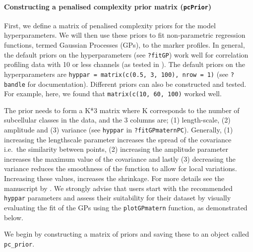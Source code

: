 \documentclass[9pt,a4paper,]{extarticle}
\begin{document}
\paragraph{\texorpdfstring{Constructing a penalised complexity prior matrix (\texttt{pcPrior})}{Constructing a penalised complexity prior matrix (pcPrior)}}\label{constructing-a-penalised-complexity-prior-matrix-pcprior}

First, we define a matrix of penalised complexity priors for the model
hyperparameters. We will then use these priors to fit non-parametric regression
functions, termed Gaussian Processes (GPs), to the marker profiles. In general,
the default priors on the hyperparameters (see \texttt{?fitGP}) work well for correlation
profiling data with 10 or less channels (as tested in \citet{Crook2022}). The default priors on
the hyperparameters are \texttt{hyppar\ =\ matrix(c(0.5,\ 3,\ 100),\ nrow\ =\ 1)} (see \texttt{?bandle}
for documentation). Different priors can also be constructed and tested. For example,
here, we found that \texttt{matrix(c(10,\ 60,\ 100)} worked well.

The prior needs to form a K*3 matrix where K corresponds to the number of
subcellular classes in the data, and the 3 columns are; (1) length-scale, (2)
amplitude and (3) variance (see \texttt{hyppar} in \texttt{?fitGPmaternPC}). Generally, (1) increasing
the lengthscale parameter increases the spread of the covariance i.e.~the similarity
between points, (2) increasing the amplitude parameter increases the maximum value
of the covariance and lastly (3) decreasing the variance reduces the smoothness of
the function to allow for local variations. Increasing these values, increases the
shrinkage. For more details see the manuscript by \citet{Crook2022}. We strongly advise
that users start with the recommended \texttt{hyppar} parameters and assess their suitability
for their dataset by visually evaluating the fit of the GPs using the \texttt{plotGPmatern}
function, as demonstrated below.

We begin by constructing a matrix of priors and saving these to an object
called \texttt{pc\_prior}.
\end{document}
